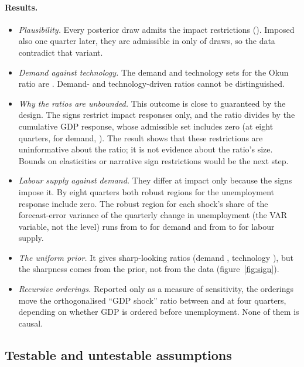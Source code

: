 \paragraph{Results.}
\begin{itemize}
  \item \emph{Plausibility.} Every posterior draw admits the impact restrictions
    (). Imposed also one quarter later, they are admissible in only
     of draws, so the data contradict that variant.
  \item \emph{Demand against technology.} The demand and technology sets for the Okun
    ratio are . Demand- and technology-driven ratios cannot be distinguished.
  \item \emph{Why the ratios are unbounded.} This outcome is close to guaranteed by the
    design. The signs restrict impact responses only, and the ratio divides by the
    cumulative GDP response, whose admissible set includes zero (at eight quarters, for
    demand, ). The result shows that these restrictions are
    uninformative about the ratio; it is not evidence about the ratio's size. Bounds on
    elasticities or narrative sign restrictions would be the next step.
  \item \emph{Labour supply against demand.} They differ at impact only because the
    signs impose it. By eight quarters both robust regions for the unemployment response
    include zero. The robust region for each shock's share of the forecast-error variance
    of the quarterly change in unemployment (the VAR variable, not the level) runs from
     to  for demand and from 
    to  for labour supply.
  \item \emph{The uniform prior.} It gives sharp-looking ratios (demand ,
    technology ), but the sharpness comes from the prior, not from the
    data (figure~\ref{fig:sign}).
  \item \emph{Recursive orderings.} Reported only as a measure of sensitivity, the
     orderings move the orthogonalised ``GDP shock'' ratio between 
    and  at four quarters, depending on whether GDP is ordered before
    unemployment. None of them is causal.
\end{itemize}

\subsection{Testable and untestable assumptions}

